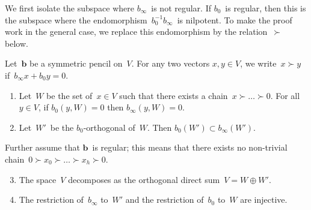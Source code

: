 \documentclass{article}%
\begin{document}
We first isolate the subspace where $b_{∞}$~is not regular.
If $b_{0}$~is regular, then this is the subspace where
the endomorphism~$b_{0}^{-1} b_{∞}$~is nilpotent.
To make the proof work in the general case,
we replace this endomorphism by the relation~$≻$ below.

\begin{lem}\label{lem:finite}%
Let~$\bm{b}$ be a symmetric pencil on~$V$. For any two vectors
$x,y ∈ V$, we write~$x ≻ y$ if~$b_{∞} x + b_0 y = 0$.
\begin{enumerate}
\item Let~$W$ be the set of~$x ∈ V$ such that there exists a chain~$x ≻ …
≻ 0$. For all~$y ∈ V$, if $b_0(y, W) = 0$ then $b_{∞}(y, W) = 0$.
\item Let~$W'$~be the $b_0$-orthogonal of~$W$. Then $b_0(W') ⊂ b_{∞}
(W')$.
\end{enumerate}
Further assume that $\bm{b}$~is regular; this means that there exists no
non-trivial chain~$0 ≻ x_0 ≻ … ≻ x_h ≻ 0$.
\begin{enumerate}
\setcounter{enumi}{2}
\item The space~$V$ decomposes as the orthogonal direct sum~$V = W ⊕ W'$.
\item The restriction of~$b_{∞}$ to~$W'$ and the restriction of~$b_{0}$
to~$W$ are injective.
\end{enumerate}
\end{lem}
\end{document}
